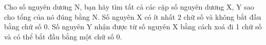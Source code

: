 Cho số nguyên dương N, bạn hãy tìm tất cả các cặp số nguyên dương X, Y sao cho tổng của nó đúng bằng N. Số nguyên X có ít nhất 2 chữ số và không bắt đầu bằng chữ số 0. Số nguyên Y nhận được từ số nguyên X bằng cách xoá đi 1 chữ số và có thể bắt đầu bằng một chữ số 0.  

\